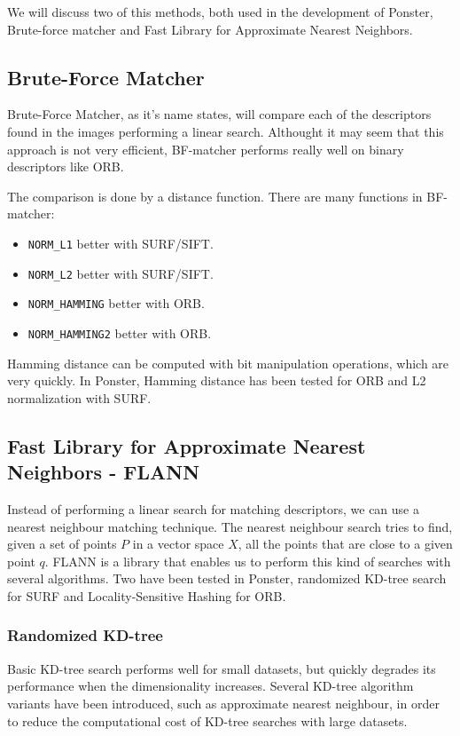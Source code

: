 We will discuss two of this methods, both used in the development of Ponster,
Brute-force matcher and Fast Library for Approximate Nearest Neighbors. 

\subsection{Brute-Force Matcher}
Brute-Force Matcher, as it's name states, will compare each of the descriptors
found in the images performing a linear search. Althought it may seem that this approach is not very
efficient, BF-matcher performs really well on binary descriptors like ORB.

The comparison is done by a distance function. There are many functions in
BF-matcher:
\begin{itemize}
\item \texttt{NORM\_L1} better with SURF/SIFT.
\item \texttt{NORM\_L2} better with SURF/SIFT.
\item \texttt{NORM\_HAMMING} better with ORB.
\item \texttt{NORM\_HAMMING2} better with ORB.
\end{itemize}
Hamming distance can be computed with bit manipulation operations, which are
very quickly. In Ponster, Hamming distance has been tested for ORB and L2
normalization with SURF. 

\subsection{Fast Library for Approximate Nearest Neighbors - FLANN}
Instead of performing a linear search for matching descriptors, we can use a
nearest neighbour matching technique. The nearest neighbour search tries to
find, given a set of points $P$ in a vector space $X$, all the points that are 
close to a given point $q$. FLANN is a library that enables us to perform this
kind of searches with several algorithms. Two have been tested in Ponster,
randomized KD-tree search for SURF and Locality-Sensitive Hashing for ORB.

\subsubsection{Randomized KD-tree}
Basic KD-tree search performs well for small datasets, but quickly degrades
its performance when the dimensionality increases. Several KD-tree algorithm
variants have been introduced, such as approximate nearest neighbour, in order
to reduce the computational cost of KD-tree searches with large datasets. 


